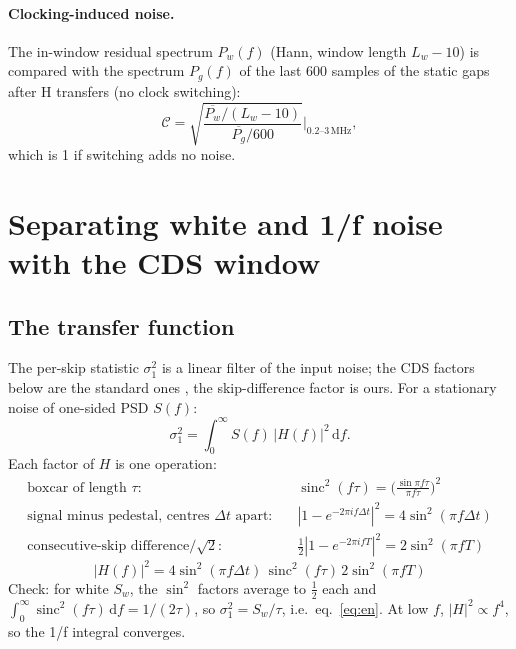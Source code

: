\documentclass[10pt,a4paper]{article}
\newcommand{\dd}{\,\mathrm{d}}
\newcommand{\sinc}{\operatorname{sinc}}
\begin{document}
\paragraph{Clocking-induced noise.} The in-window residual spectrum $P_w(f)$ (Hann, window length $L_w-10$) is
compared with the spectrum $P_g(f)$ of the last 600 samples of the static gaps after H transfers (no clock switching):
\begin{equation}
\mathcal C=\sqrt{\frac{\overline{P_w}/(L_w-10)}{\overline{P_g}/600}}\Big|_{0.2\text{--}3\,\text{MHz}} ,
\end{equation}
which is 1 if switching adds no noise.

\section{Separating white and 1/f noise with the CDS window}\label{sec:H}

\subsection{The transfer function}
The per-skip statistic $\sigma_1^2$ is a linear filter of the input noise; the CDS factors below are the standard
ones \cite{hopkinson1982,janesick2001}, the skip-difference factor is ours. For a stationary noise of one-sided PSD
$S(f)$:
\begin{equation}
\sigma_1^2=\int_0^\infty S(f)\,|H(f)|^2\dd f .
\end{equation}
Each factor of $H$ is one operation:
\begin{align}
\text{boxcar of length }\tau:&\quad \sinc^2(f\tau)=\Big(\tfrac{\sin\pi f\tau}{\pi f\tau}\Big)^2\\
\text{signal minus pedestal, centres } \Delta t \text{ apart:}&\quad |1-e^{-2\pi i f\Delta t}|^2=4\sin^2(\pi f\Delta t)\\
\text{consecutive-skip difference}/\sqrt2:&\quad \tfrac12|1-e^{-2\pi i fT}|^2=2\sin^2(\pi fT)
\end{align}
\begin{equation}
\boxed{|H(f)|^2=4\sin^2(\pi f\Delta t)\,\sinc^2(f\tau)\,2\sin^2(\pi fT)}
\end{equation}
Check: for white $S_w$, the $\sin^2$ factors average to $\tfrac12$ each and $\int_0^\infty\sinc^2(f\tau)\dd f=1/(2\tau)$,
so $\sigma_1^2=S_w/\tau$, i.e.\ eq.~\eqref{eq:en}. At low $f$, $|H|^2\propto f^4$, so the 1/f integral converges.
\end{document}

